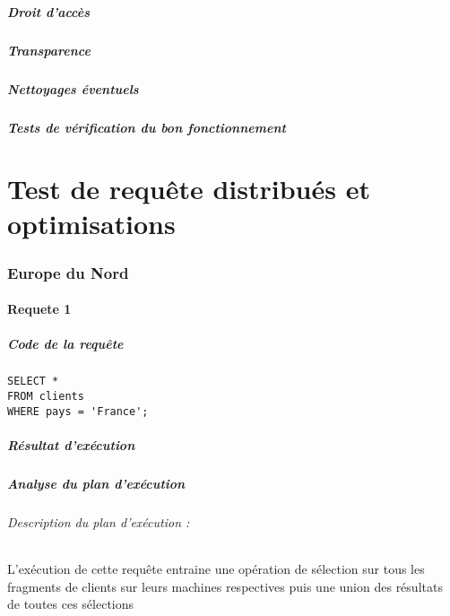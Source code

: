 \documentclass[10pt,a4paper,twoside]{article}
\begin{document}
\subsubsection{Droit d'accès}
\subsubsection{Transparence}
\subsubsection{Nettoyages éventuels}
\subsubsection{Tests de vérification du bon fonctionnement}

\newpage
\part{Test de requête distribués et optimisations}
\section{Europe du Nord}
\subsection{Requete 1}
\subsubsection{Code de la requête}
\begin{verbatim}
SELECT *
FROM clients
WHERE pays = 'France';
\end{verbatim}
\subsubsection{Résultat d'exécution}

\subsubsection{Analyse du plan d'exécution}
\paragraph{Description du plan d'exécution :}
L'exécution de cette requête entraine une opération de sélection sur tous les fragments de clients sur leurs machines respectives puis une union des résultats de toutes ces sélections
\end{document}

